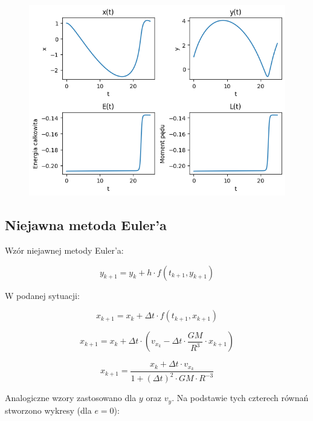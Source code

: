 \documentclass{article}
\begin{document}
	\begin{figure}[h]
		\centering
		\includegraphics[scale = 0.70]{wykres2.png}
	\end{figure}


	\newpage

	\subsection*{Niejawna metoda Euler'a}

	Wzór niejawnej metody Euler'a:

	\begin{equation}
		y_{k+1} = y_k + h \cdot f(t_{k+1}, y_{k+1})
	\end{equation}

	W podanej sytuacji:

	\begin{equation}
		x_{k+1} = x_k + \Delta t \cdot f(t_{k+1}, x_{k+1})
	\end{equation}

	\begin{equation}
		x_{k+1} = x_k + \Delta t \cdot (v_{x_{k}} - \Delta t \cdot \frac{GM}{R^3} \cdot x_{k+1})
	\end{equation}

	\begin{equation}
		x_{k+1} = \frac{x_k+ \Delta t \cdot  v_{x_{k}}}{1 + (\Delta t)^2 \cdot GM \cdot R^{-3}}
	\end{equation}



	

	Analogiczne wzory zastosowano dla $y$ oraz $v_y$. Na podstawie tych czterech równań stworzono wykresy (dla $e = 0$):
\end{document}
